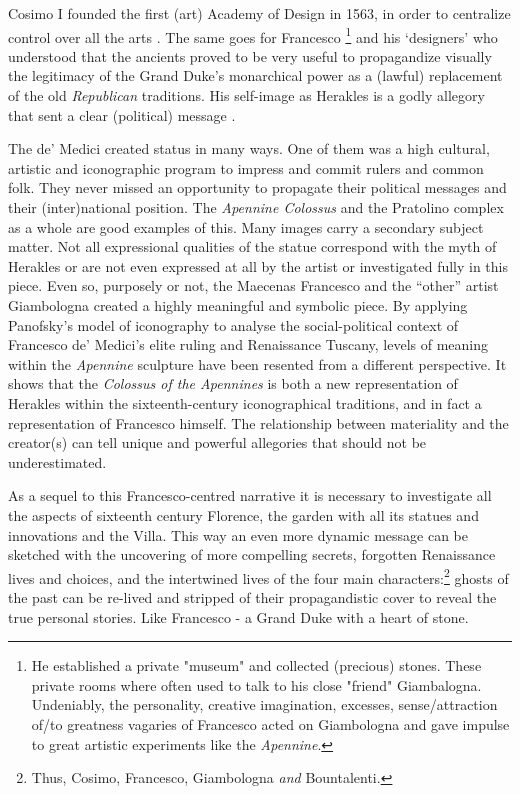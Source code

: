 Cosimo I founded the first (art) Academy of Design in 1563, in order to centralize control over all the arts \parencites[9,200]{Partridge2009}.
The same goes for Francesco%
\footnote{He established a private "museum" and collected (precious) stones. These private rooms where often used to talk to his close "friend" Giambalogna. Undeniably, the personality, creative imagination, excesses, sense/attraction of/to greatness vagaries of Francesco acted on Giambologna and gave impulse to great artistic experiments like the \textit{Apennine}.}  %
and his ‘designers’ who understood that  the ancients proved to be very useful to propagandize visually the legitimacy of the Grand Duke’s monarchical power as a (lawful) replacement of the old \textit{Republican} traditions. His self-image as Herakles is a godly allegory that sent a clear (political) message \parencites[295-296,302-303]{Goudriaan2015}[168,391]{Goldthwaite2009}.


The de’ Medici created status in many ways. One of them was a high cultural, artistic and iconographic program to impress and commit rulers and common folk. They never missed an opportunity to propagate their political messages and their (inter)national position. The \textit{Apennine Colossus} and the Pratolino complex as a whole are good examples of this. Many images carry a secondary subject matter. Not all expressional qualities of the statue correspond with the myth of Herakles or are not even expressed at all by the artist or investigated fully in this piece. Even so, purposely or not, the Maecenas Francesco and the “other” artist Giambologna created a highly meaningful and symbolic piece. By applying Panofsky’s model of iconography to analyse the social-political context of Francesco de’ Medici’s elite ruling and Renaissance Tuscany, levels of meaning within the \textit{Apennine} sculpture have been resented from a different perspective. It shows that the \textit{Colossus of the Apennines} is both a new representation of Herakles within the sixteenth-century iconographical traditions, and in fact a representation of Francesco himself. The relationship between materiality and the creator(s) can tell unique and powerful allegories that should not be underestimated.

As a sequel to this Francesco-centred narrative it is necessary to investigate all the aspects of sixteenth century Florence, the garden with all its statues and innovations and the Villa. This way an even more dynamic message can be sketched with the uncovering of more compelling secrets, forgotten Renaissance lives and choices, and the intertwined lives of the four main characters:\footnote{Thus, Cosimo, Francesco, Giambologna \textit{and} Bountalenti.}  ghosts of the past can be re-lived and stripped of their propagandistic cover to reveal the true personal stories. Like Francesco - a Grand Duke with a heart of stone.





\IJSRAclosing%
